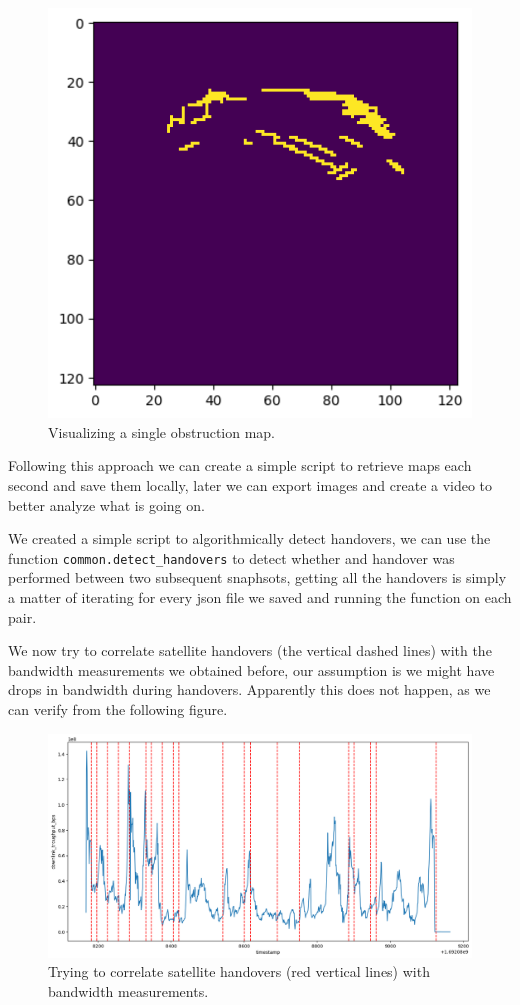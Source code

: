 \documentclass[IN,11pt,twoside,openright,bachelor,english]{tumthesis}
\begin{document}
\begin{figure}
	\centering
	\includegraphics[width=0.5\columnwidth]{img/single_map.png}
	\caption{Visualizing a single obstruction map.}
	\label{fig:vis-single-map}
\end{figure}


Following this approach we can create a simple script to retrieve maps each second and save them locally, later we can export images and create a video to better analyze what is going on. 

We created a simple script to algorithmically detect handovers, we can use the function \texttt{common.detect\_handovers} to detect whether and handover was performed between two subsequent snaphsots, getting all the handovers is simply a matter of iterating for every json file we saved and running the function on each pair.

We now try to correlate satellite handovers (the vertical dashed lines) with the bandwidth measurements we obtained before, our assumption is we might have drops in bandwidth during handovers. Apparently this does not happen, as we can verify from the following figure.


\begin{figure}
	\centering
	\includegraphics[width=1\columnwidth]{img/correlation_handovers_bw.png}
	\caption{Trying to correlate satellite handovers (red vertical lines) with bandwidth measurements.}
	\label{fig:vis-correlation-handovers}
\end{figure}
\end{document}
